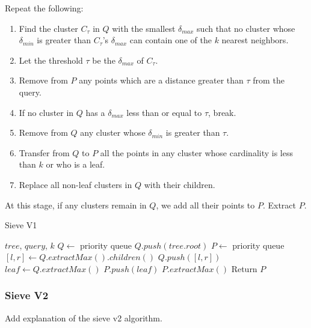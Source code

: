 Repeat the following: 
\begin{enumerate}
\item Find the cluster $C_{\tau}$ in $Q$ with the smallest $\delta_{max}$ such that no cluster whose $\delta_{min}$ is greater than $C_{\tau}$'s $\delta_{max}$ can contain one of the $k$ nearest neighbors.
\item Let the threshold $\tau$ be the $\delta_{max}$ of $C_{\tau}$.
\item Remove from $P$ any points which are a distance greater than $\tau$ from the query. 
\item If no cluster in $Q$ has a $\delta_{max}$ less than or equal to $\tau$, break.
\item Remove from $Q$ any cluster whose $\delta_{min}$ is greater than $\tau$.
\item Transfer from $Q$ to $P$ all the points in any cluster whose cardinality is less than $k$ or who is a leaf. 
\item Replace all non-leaf clusters in $Q$ with their children. 
\end{enumerate}

At this stage, if any clusters remain in $Q$, we add all their points to $P$. 
Extract $P$. 

\begin{algorithm} %
    \caption{Sieve V1} %
    \label{alg:sieve_v1} %
    \begin{algorithmic}[2] %
        \REQUIRE $tree$, $query$, $k$
        \STATE $Q \leftarrow$ priority queue
        \STATE $Q.push(tree.root)$
        \STATE $P \leftarrow$ priority queue
                \STATE $[l, r] \leftarrow Q.extractMax().children()$
                \STATE $Q.push([l, r])$
            \ENDWHILE
            \STATE $leaf \leftarrow Q.extractMax()$
            \STATE $P.push(leaf)$
                \STATE $P.extractMax()$
            \ENDWHILE
        \ENDWHILE
        \STATE Return $P$
    \end{algorithmic}
    \end{algorithm}

\subsubsection{Sieve V2}
\label{subsubsec:methods:knn-search:sieve-v2}
Add explanation of the sieve v2 algorithm.


